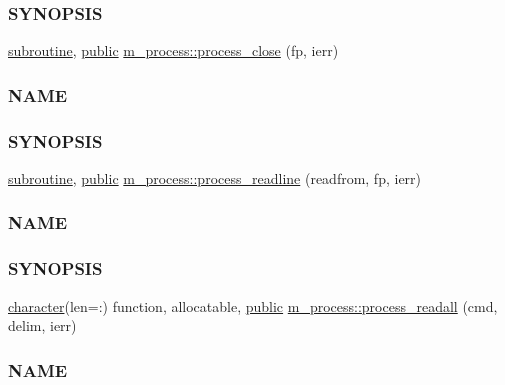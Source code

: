 \begin{DoxyCompactItemize}
\begin{DoxyCompactList}
\subsubsection*{S\+Y\+N\+O\+P\+S\+IS}\end{DoxyCompactList}\item 
\hyperlink{M__stopwatch_83_8txt_acfbcff50169d691ff02d4a123ed70482}{subroutine}, \hyperlink{M__stopwatch_83_8txt_a2f74811300c361e53b430611a7d1769f}{public} \hyperlink{namespacem__process_ab4c5cad3fb46686f0c9b71c3a634f6ae}{m\+\_\+process\+::process\+\_\+close} (fp, ierr)
\begin{DoxyCompactList}\small\item\em \subsubsection*{N\+A\+ME}

\subsubsection*{S\+Y\+N\+O\+P\+S\+IS}\end{DoxyCompactList}\item 
\hyperlink{M__stopwatch_83_8txt_acfbcff50169d691ff02d4a123ed70482}{subroutine}, \hyperlink{M__stopwatch_83_8txt_a2f74811300c361e53b430611a7d1769f}{public} \hyperlink{namespacem__process_acbc72c5ed371430a471aa1f3010fbbda}{m\+\_\+process\+::process\+\_\+readline} (readfrom, fp, ierr)
\begin{DoxyCompactList}\small\item\em \subsubsection*{N\+A\+ME}

\subsubsection*{S\+Y\+N\+O\+P\+S\+IS}\end{DoxyCompactList}\item 
\hyperlink{option__stopwatch_83_8txt_abd4b21fbbd175834027b5224bfe97e66}{character}(len=\+:) function, allocatable, \hyperlink{M__stopwatch_83_8txt_a2f74811300c361e53b430611a7d1769f}{public} \hyperlink{namespacem__process_a7dd759a1344789477ae1e205d7fa9a51}{m\+\_\+process\+::process\+\_\+readall} (cmd, delim, ierr)
\begin{DoxyCompactList}\small\item\em \subsubsection*{N\+A\+ME}


\end{DoxyCompactList}
\end{DoxyCompactItemize}

